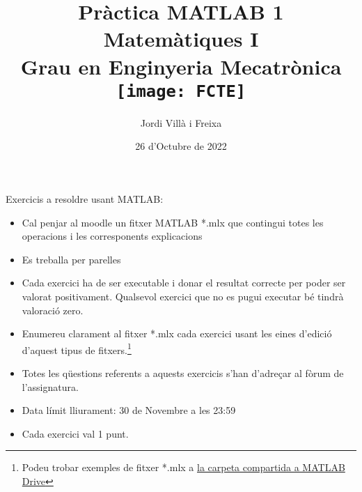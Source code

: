 \documentclass[]{article}
\title{Pràctica MATLAB 1 \\ Matemàtiques I \\ Grau en Enginyeria Mecatrònica \\\vspace{2cm} \texttt{[image: FCTE]}}
\author{Jordi Villà i Freixa}
\date{26 d'Octubre de 2022}
\begin{document}
\maketitle

Exercicis a resoldre usant MATLAB:
\begin{itemize}
  \item Cal penjar al moodle un fitxer MATLAB *.mlx que contingui totes les operacions i les corresponents explicacions
  \item Es treballa per parelles
  \item Cada exercici ha de ser executable i donar el resultat correcte per poder ser valorat positivament. Qualsevol exercici que no es pugui executar bé tindrà valoració zero.
  \item Enumereu clarament al fitxer *.mlx cada exercici usant les eines d'edició d'aquest tipus de fitxers.\footnote{Podeu trobar exemples de fitxer *.mlx a \href{https://drive.matlab.com/sharing/8337394b-f49e-4b91-b153-51e8135aa605}{la carpeta compartida a MATLAB Drive}}
  \item Totes les qüestions referents a aquests exercicis s'han d'adreçar al fòrum de l'assignatura.
  \item Data límit lliurament: 30 de Novembre a les 23:59
  \item Cada exercici val 1 punt.
\end{itemize}
\end{document}
